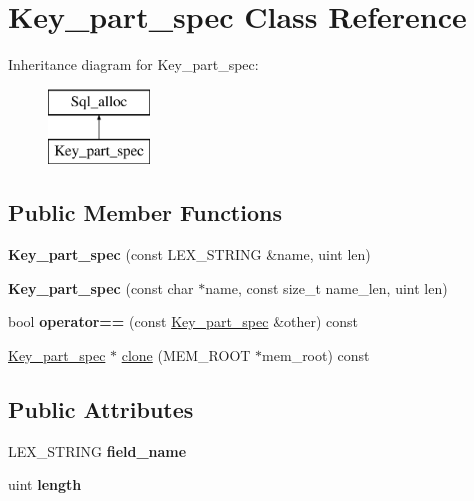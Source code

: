 \hypertarget{classKey__part__spec}{}\section{Key\+\_\+part\+\_\+spec Class Reference}
\label{classKey__part__spec}
Inheritance diagram for Key\+\_\+part\+\_\+spec\+:\begin{figure}[H]
\begin{center}
\leavevmode
\includegraphics[height=2.000000cm]{classKey__part__spec}
\end{center}
\end{figure}
\subsection*{Public Member Functions}
\begin{DoxyCompactItemize}
\item 
\mbox{\label{classKey__part__spec_a405f8b36a8af6f421500678dfb5bb142}} 
{\bfseries Key\+\_\+part\+\_\+spec} (const L\+E\+X\+\_\+\+S\+T\+R\+I\+NG \&name, uint len)
\item 
\mbox{\label{classKey__part__spec_a78f58d90373c3a49d2a296ea78aa2eaa}} 
{\bfseries Key\+\_\+part\+\_\+spec} (const char $\ast$name, const size\+\_\+t name\+\_\+len, uint len)
\item 
\mbox{\label{classKey__part__spec_a9da16a4768a6f68d4eae50db9d078c43}} 
bool {\bfseries operator==} (const \mbox{\hyperlink{classKey__part__spec}{Key\+\_\+part\+\_\+spec}} \&other) const
\item 
\mbox{\hyperlink{classKey__part__spec}{Key\+\_\+part\+\_\+spec}} $\ast$ \mbox{\hyperlink{classKey__part__spec_adf40542629144b3dc70f9ae4b4b27c78}{clone}} (M\+E\+M\+\_\+\+R\+O\+OT $\ast$mem\+\_\+root) const
\end{DoxyCompactItemize}
\subsection*{Public Attributes}
\begin{DoxyCompactItemize}
\item 
\mbox{\label{classKey__part__spec_a1e79a883c5b5358f0397e4fe56c09f5d}} 
L\+E\+X\+\_\+\+S\+T\+R\+I\+NG {\bfseries field\+\_\+name}
\item 
\mbox{\label{classKey__part__spec_add00fda3a992ed642aad95089b330e79}} 
uint {\bfseries length}
\end{DoxyCompactItemize}
